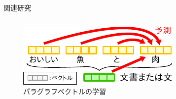 \documentclass[unicode,10pt]{beamer}
\begin{document}
\begin{frame}[t]
\begin{block}{関連研究}
\begin{columns}[onlytextwidth,t]
    \begin{column}{0.325\textwidth}
      \begin{figure}
        \includegraphics[width=0.9\linewidth]{fig/paragraph_vector_v2.pdf}
        \caption*{パラグラフベクトルの学習}
      \end{figure}
    \end{column}
  \end{columns}
\end{block}


\end{frame}
\end{document}

